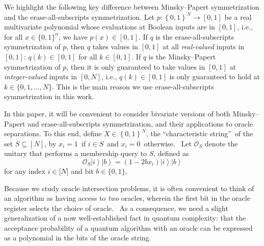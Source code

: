 We highlight the following key difference between Minsky--Papert symmetrization
and the erase-all-subscripts symmetrization. Let $p:\left\{ 0,1\right\} ^{N}\rightarrow [0, 1]$
be a real multivariate polynomial whose evaluations at Boolean inputs are in
$[0, 1]$, i.e., for all $x\in\{0,1\}^n$, we have $p(x)\in[0,1]$.
If $q$ is the erase-all-subscripts symmetrization of $p$, 
then $q$ takes values in $[0,1]$ at all \emph{real-valued}
inputs in $[0, 1]$: $q(k) \in [0,1]$ for all $k \in [0,1]$. 
If $q$ is the Minsky--Papert symmetrization of $p$,
then it is only guaranteed to take values in $[0,1]$ at 
\emph{integer-valued} inputs in $[0, N]$, i.e., $q(k)\in [0,1]$ 
is only guaranteed to hold at $k\in\{0,1,\ldots,N\}$.
This is the main reason we use erase-all-subscripts symmetrization
in this work.

In this paper, it will be convenient
to consider bivariate versions of both
Minsky--Papert and erase-all-subscripts
symmetrization, and their applications to oracle separations. To this end,
define $X\in \left\{ 0,1\right\} ^{N}$, the \textquotedblleft characteristic
string\textquotedblright\ of the set $S\subseteq \left[ N\right] $, by $
x_{i}=1$\ if $i\in S$\ and $x_{i}=0$\ otherwise. \ Let $\mathcal{O}_{S}$
denote the unitary that performs a membership query to $S$, defined as
\begin{equation}
\mathcal{O}_{S}\left\vert i\right\rangle \left\vert b\right\rangle
=(1-2bx_{i})\left\vert i\right\rangle \left\vert b\right\rangle
\end{equation}
for any index $i\in \lbrack N]$ and bit $b\in \{0,1\}$.

Because we study oracle intersection problems, it is often convenient to
think of an algorithm as having access to \textit{two} oracles, wherein the
first bit in the oracle register selects the choice of oracle. \ As a
consequence, we need a slight generalization of a now well-established fact
in quantum complexity: that the acceptance probability of a quantum
algorithm with an oracle can be expressed as a polynomial in the bits of the
oracle string.

